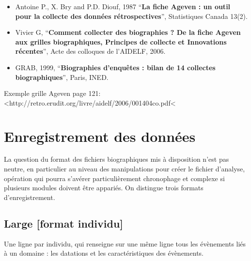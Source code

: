\documentclass[
  12pt,
  letterpaper,
  DIV=11,
  numbers=noendperiod,
  onepage,
  openany]{scrreprt}
\providecommand{\tightlist}{%
  \setlength{\itemsep}{0pt}\setlength{\parskip}{0pt}}\usepackage{longtable,booktabs,array}
\begin{document}
\begin{tcolorbox}[enhanced jigsaw, arc=.35mm, bottomrule=.15mm, titlerule=0mm, colbacktitle=quarto-callout-note-color!10!white, left=2mm, opacitybacktitle=0.6, toprule=.15mm, title=\textcolor{quarto-callout-note-color}{\faInfo}\hspace{0.5em}{Références}, colframe=quarto-callout-note-color-frame, breakable, coltitle=black, opacityback=0, toptitle=1mm, bottomtitle=1mm, rightrule=.15mm, leftrule=.75mm, colback=white]

\begin{itemize}
\tightlist
\item
  Antoine P., X. Bry and P.D. Diouf, 1987 ``\textbf{La fiche Ageven : un
  outil pour la collecte des données rétrospectives}'', Statistiques
  Canada 13(2).
\item
  Vivier G, ``\textbf{Comment collecter des biographies ? De la fiche
  Ageven aux grilles biographiques, Principes de collecte et Innovations
  récentes}'', Acte des colloques de l'AIDELF, 2006.
\item
  GRAB, 1999, ``\textbf{Biographies d'enquêtes : bilan de 14 collectes
  biographiques}'', Paris, INED.
\end{itemize}

Exemple grille Ageven page 121:
\textless http://retro.erudit.org/livre/aidelf/2006/001404co.pdf\textless{}

\end{tcolorbox}

\hypertarget{enregistrement-des-donnuxe9es}{%
\section{Enregistrement des
données}\label{enregistrement-des-donnuxe9es}}

La question du format des fichiers biographiques mis à disposition n'est
pas neutre, en particulier au niveau des manipulations pour créer le
fichier d'analyse, opération qui pourra s'avérer particulièrement
chronophage et complexe si plusieurs modules doivent être appariés. On
distingue trois formats d'enregistrement.

\hypertarget{large-format-individu}{%
\subsection{Large {[}format individu{]}}\label{large-format-individu}}

Une ligne par individu, qui renseigne sur une même ligne tous les
évènements liés à un domaine : les datations et les caractéristiques des
évènements.
\end{document}
